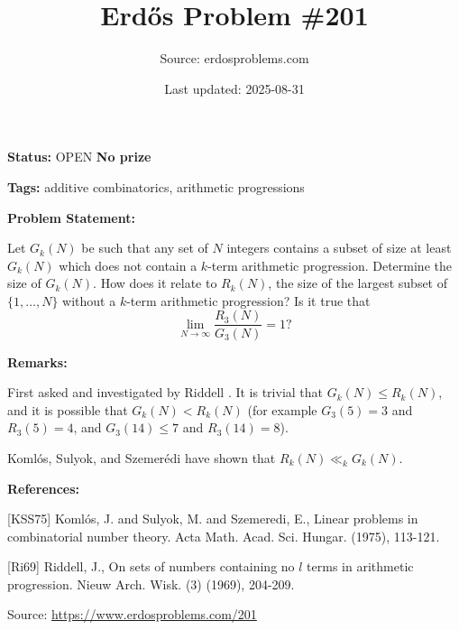 \documentclass{article}
\title{Erd\H{o}s Problem \#201}
\date{Last updated: 2025-08-31}
\author{Source: erdosproblems.com}
\begin{document}
\maketitle

\noindent\textbf{Status:} OPEN \quad \textbf{No prize}

\noindent\textbf{Tags:} additive combinatorics, arithmetic progressions

\medskip
\noindent\textbf{Problem Statement:}

Let $G_k(N)$ be such that any set of $N$ integers contains a subset of size at least $G_k(N)$ which does not contain a $k$-term arithmetic progression. Determine the size of $G_k(N)$. How does it relate to $R_k(N)$, the size of the largest subset of $\{1,\ldots,N\}$ without a $k$-term arithmetic progression? Is it true that\[\lim_{N\to \infty}\frac{R_3(N)}{G_3(N)}=1?\]

\bigskip
\noindent\textbf{Remarks:}

First asked and investigated by Riddell \cite{Ri69}. It is trivial that $G_k(N)\leq R_k(N)$, and it is possible that $G_k(N) <R_k(N)$ (for example $G_3(5)=3$ and $R_3(5)=4$, and $G_3(14)\leq 7$ and $R_3(14)=8$).

Koml\'{o}s, Sulyok, and Szemer\'{e}di \cite{KSS75} have shown that $R_k(N) \ll_k G_k(N)$.

\bigskip
\noindent\textbf{References:}

[KSS75] Koml\'{o}s, J. and Sulyok, M. and Szemeredi, E., Linear problems in combinatorial number theory. Acta Math. Acad. Sci. Hungar. (1975), 113-121.
 
 [Ri69] Riddell, J., On sets of numbers containing no $l$ terms in arithmetic progression. Nieuw Arch. Wisk. (3) (1969), 204-209.

\bigskip
\noindent\small{Source: \url{https://www.erdosproblems.com/201}}
\end{document}

